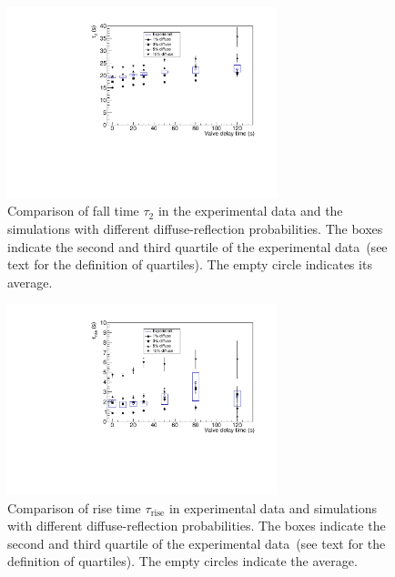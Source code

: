 	
\begin{figure}[h!]
  \centering \includegraphics[width=0.7\textwidth]{falltime.pdf}
  \caption[Comparison of UCN fall time between simulations and data
  ]{Comparison of fall time $\tau_2$ in the experimental data and the
    simulations with different diffuse-reflection probabilities. The
    boxes indicate the second and third quartile of the experimental
    data~(see text for the definition of quartiles).  The empty circle
    indicates its average.}
\label{fig:falltime}
\end{figure}

\begin{figure}[h!]
\centering
\includegraphics[width=0.7\textwidth]{risetime.pdf}
\caption[Comparison of UCN rise time between simulations and
data]{Comparison of rise time $\tau_{\mathrm{rise}}$ in experimental
  data and simulations with different diffuse-reflection
  probabilities. The boxes indicate the second and third quartile of
  the experimental data~(see text for the definition of
  quartiles). The empty circles indicate the average.}
\label{fig:risetime}
\end{figure}




